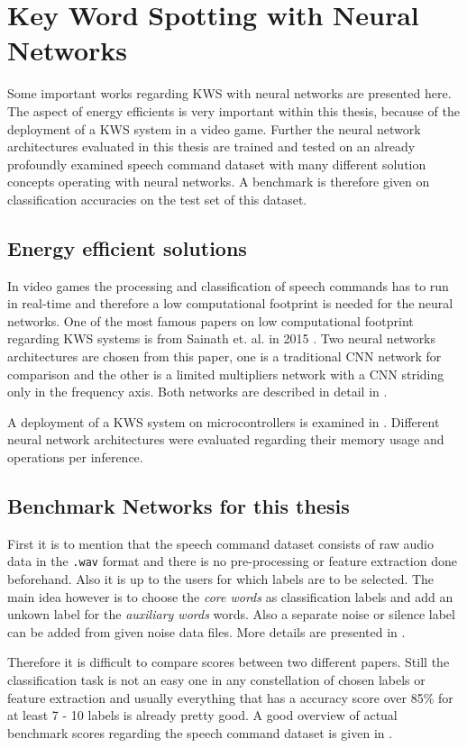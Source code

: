 
\section{Key Word Spotting with Neural Networks}\label{sec:prev_kws}
\thesisStateNotReady
Some important works regarding KWS with neural networks are presented here. 
The aspect of energy efficients is very important within this thesis, because of the deployment of a KWS system in a video game.
Further the neural network architectures evaluated in this thesis are trained and tested on an already profoundly examined speech command dataset \cite{Warden2018} with many different solution concepts operating with neural networks. 
A benchmark is therefore given on classification accuracies on the test set of this dataset.



\subsection{Energy efficient solutions}
In video games the processing and classification of speech commands has to run in real-time and therefore a low computational footprint is needed for the neural networks.
One of the most famous papers on low computational footprint regarding KWS systems is from Sainath et. al. in 2015 \cite{Sainath2015}.
Two neural networks architectures are chosen from this paper, one is a traditional CNN network for comparison and the other is a limited multipliers network with a CNN striding only in the frequency axis.
Both networks are described in detail in .

A deployment of a KWS system on microcontrollers is examined in \cite{Zhang2017}. 
Different neural network architectures were evaluated regarding their memory usage and operations per inference.



\subsection{Benchmark Networks for this thesis}\label{sec:prev_kws_benchmark}
First it is to mention that the speech command dataset \cite{Warden2018} consists of raw audio data in the \texttt{.wav} format and there is no pre-processing or feature extraction done beforehand.
Also it is up to the users for which labels are to be selected.
The main idea however is to choose the \emph{core words} as classification labels and add an unkown label for the \emph{auxiliary words} words.
Also a separate noise or silence label can be added from given noise data files.
More details are presented in .

Therefore it is difficult to compare scores between two different papers.
Still the classification task is not an easy one in any constellation of chosen labels or feature extraction and usually everything that has a accuracy score over 85\% for at least 7 - 10 labels is already pretty good.
A good overview of actual benchmark scores regarding the speech command dataset is given in \cite{PaperswithcodeKWS}.



